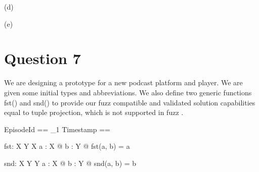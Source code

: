 \documentclass[a4paper,10pt,fleqn]{article}
\begin{document}
\medskip

\noindent\hspace*{\parindent}(d) 

\medskip

\noindent\hspace*{\parindent}(e) 


\bigskip

\setlength{\leftskip}{\dimexpr\parindent+2em\relax}
\newpage

\setlength{\leftskip}{0pt}
\section*{Question 7}

\noindent We are designing a prototype for a new podcast platform and player.  We are given some initial types and abbreviations.  We also define two generic functions fst() and snd() to provide our fuzz compatible and validated solution capabilities equal to tuple projection, which is not supported in fuzz \citep{spivey1993fuzz}. 

\bigskip

\begin{zed}\end{zed}

\begin{zed}
EpisodeId == \nat_1
\also
Timestamp == \nat
\end{zed}

\begin{gendef}[X, Y]
  fst: X \cross Y \fun X
\where
  \forall a : X @ \forall b : Y @ fst(a, b) = a
\end{gendef}

\begin{gendef}[X, Y]
  snd: X \cross Y \fun Y
\where
  \forall a : X @ \forall b : Y @ snd(a, b) = b
\end{gendef}
\end{document}

